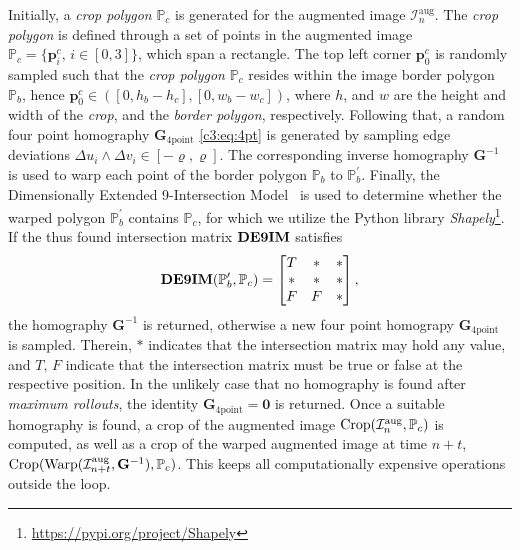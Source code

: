 Initially, a \textit{crop polygon} $\mathbb{P}_c$ is generated for the augmented image $\mathcal{I}^\text{aug}_n$. The \textit{crop polygon} is defined through a set of points in the augmented image $\mathbb{P}_c = \{\mathbf{p}^c_i,\,i\in \left[0,3\right]\}$, which span a rectangle. The top left corner $\mathbf{p}^c_0$ is randomly sampled such that the \textit{crop polygon} $\mathbb{P}_c$ resides within the image border polygon $\mathbb{P}_b$, hence $\mathbf{p}^c_0 \in ([0, h_b - h_c], [0, w_b - w_c])$, where $h$, and $w$ are the height and width of the \textit{crop}, and the \textit{border polygon}, respectively. Following that, a random four point homography $\mathbf{G}_{4\text{point}}$ \eqref{c3:eq:4pt} is generated by sampling edge deviations $\Delta u_i \land \Delta v_i \in [-\varrho, \varrho]$. The corresponding inverse homography $\mathbf{G}^{-1}$ is used to warp each point of the border polygon $\mathbb{P}_b$ to $\mathbb{P}^\prime_b$. Finally, the Dimensionally Extended 9-Intersection Model~\cite{clementini1994modelling} is used to determine whether the warped polygon $\mathbb{P}^\prime_b$ contains $\mathbb{P}_c$, for which we utilize the Python library \textit{Shapely}\footnote[3]{\url{https://pypi.org/project/Shapely}}. If the thus found intersection matrix $\operatorname{\mathbf{DE9IM}}$ satisfies
\begin{equation}
    \operatorname{\mathbf{DE9IM}}(\mathbb{P}^\prime_b, \mathbb{P}_c) = \begin{bmatrix}
        T & * & * \\
        * & * & * \\
        F & F & *
    \end{bmatrix},
\end{equation}
the homography $\mathbf{G}^{-1}$ is returned, otherwise a new four point homograpy $\mathbf{G}_{4\text{point}}$ is sampled. Therein, $*$ indicates that the intersection matrix may hold any value, and $T,\,F$ indicate that the intersection matrix must be true or false at the respective position. In the unlikely case that no homography is found after \textit{maximum rollouts}, the identity $\mathbf{G}_{4\text{point}} = \mathbf{0}$ is returned. Once a suitable homography is found, a crop of the augmented image $\operatorname{Crop}(\mathcal{I}^\text{aug}_n, \mathbb{P}_c)$ is computed, as well as a crop of the warped augmented image at time $n+t$, $\operatorname{Crop}(\operatorname{Warp}(\mathcal{I}^\text{aug}_{n+t}, \mathbf{G}^{-1}), \mathbb{P}_c)$. This keeps all computationally expensive operations outside the loop.

